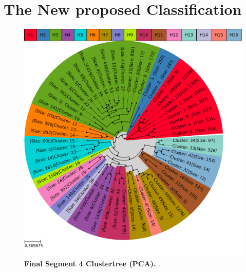 \section{The New proposed Classification} \label{sec:Serotype_Classification}

\blindtext


\begin{figure}[!hbt]
    \centering
    \includegraphics[width=\textwidth]{Results/Clustertree_Segment_4.pdf}
    \caption[Final Segment 4 Clustertree (\Acrshort{PCA})]{\textbf{Final Segment 4 Clustertree (\Acrshort{PCA}).} .}
    \label{fig:PCA_Clusteree_Final}
\end{figure}